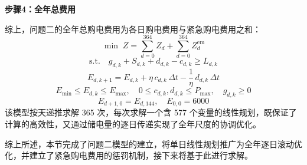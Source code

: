 \textbf{步骤4：全年总费用}

综上，问题二的全年总购电费用为各日购电费用与紧急购电费用之和：
\begin{equation}
    \min \; Z=\sum_{d=0}^{364}Z_d+\sum_{d=0}^{364}Z^{\mathrm{em}}_d
\end{equation}
\begin{equation}
    \mathrm{s.t.}\quad g_{d,k}+S_{d,k}+d_{d,k}-c_{d,k}\geq L_{d,k}
\end{equation}
\begin{equation}
    E_{d,k+1}=E_{d,k}+\eta\,c_{d,k}\,\Delta t-\frac{1}{\eta}\,d_{d,k}\,\Delta t
\end{equation}
\begin{equation}
    E_{\min}\leq E_{d,k}\leq E_{\max},\quad 0\leq c_{d,k},d_{d,k}\leq P_{\max},\quad g_{d,k}\geq 0
\end{equation}
\begin{equation}
    E_{d+1,0}=E_{d,144},\quad E_{0,0}=6000
\end{equation}
该模型按天递推求解 365 次，每次求解一个含 577 个变量的线性规划，既保证了计算的高效性，又通过储电量的逐日传递实现了全年尺度的协调优化。

综上所述，本节完成了问题二模型的建立，将单日线性规划推广为全年逐日滚动优化，并建立了紧急购电费用的惩罚机制，接下来将基于此进行求解。
